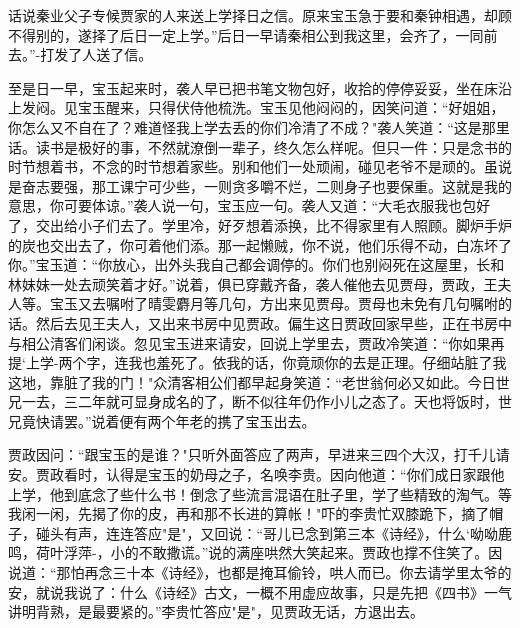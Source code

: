 话说秦业父子专候贾家的人来送上学择日之信。原来宝玉急于要和秦钟相遇，却顾不得别的，遂择了后日一定上学。”后日一早请秦相公到我这里，会齐了，一同前去。”-打发了人送了信。

至是日一早，宝玉起来时，袭人早已把书笔文物包好，收拾的停停妥妥，坐在床沿上发闷。见宝玉醒来，只得伏侍他梳洗。宝玉见他闷闷的，因笑问道：“好姐姐，你怎么又不自在了？难道怪我上学去丢的你们冷清了不成？"袭人笑道：“这是那里话。读书是极好的事，不然就潦倒一辈子，终久怎么样呢。但只一件：只是念书的时节想着书，不念的时节想着家些。别和他们一处顽闹，碰见老爷不是顽的。虽说是奋志要强，那工课宁可少些，一则贪多嚼不烂，二则身子也要保重。这就是我的意思，你可要体谅。”袭人说一句，宝玉应一句。袭人又道：“大毛衣服我也包好了，交出给小子们去了。学里冷，好歹想着添换，比不得家里有人照顾。脚炉手炉的炭也交出去了，你可着他们添。那一起懒贼，你不说，他们乐得不动，白冻坏了你。”宝玉道：“你放心，出外头我自己都会调停的。你们也别闷死在这屋里，长和林妹妹一处去顽笑着才好。”说着，俱已穿戴齐备，袭人催他去见贾母，贾政，王夫人等。宝玉又去嘱咐了晴雯麝月等几句，方出来见贾母。贾母也未免有几句嘱咐的话。然后去见王夫人，又出来书房中见贾政。偏生这日贾政回家早些，正在书房中与相公清客们闲谈。忽见宝玉进来请安，回说上学里去，贾政冷笑道：“你如果再提`上学-两个字，连我也羞死了。依我的话，你竟顽你的去是正理。仔细站脏了我这地，靠脏了我的门！"众清客相公们都早起身笑道：“老世翁何必又如此。今日世兄一去，三二年就可显身成名的了，断不似往年仍作小儿之态了。天也将饭时，世兄竟快请罢。”说着便有两个年老的携了宝玉出去。

贾政因问：“跟宝玉的是谁？"只听外面答应了两声，早进来三四个大汉，打千儿请安。贾政看时，认得是宝玉的奶母之子，名唤李贵。因向他道：“你们成日家跟他上学，他到底念了些什么书！倒念了些流言混语在肚子里，学了些精致的淘气。等我闲一闲，先揭了你的皮，再和那不长进的算帐！"吓的李贵忙双膝跪下，摘了帽子，碰头有声，连连答应"是"，又回说：“哥儿已念到第三本《诗经》，什么`呦呦鹿鸣，荷叶浮萍-，小的不敢撒谎。”说的满座哄然大笑起来。贾政也撑不住笑了。因说道：“那怕再念三十本《诗经》，也都是掩耳偷铃，哄人而已。你去请学里太爷的安，就说我说了：什么《诗经》古文，一概不用虚应故事，只是先把《四书》一气讲明背熟，是最要紧的。”李贵忙答应"是"，见贾政无话，方退出去。

